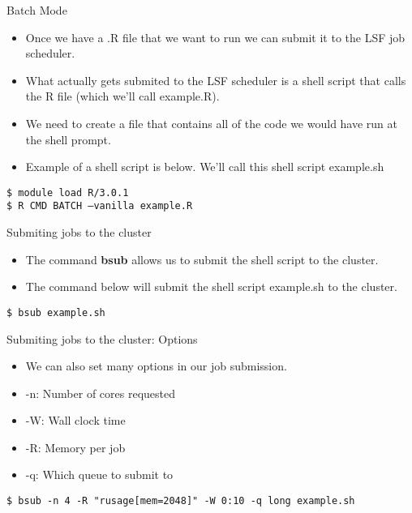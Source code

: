 \documentclass[table]{beamer}\usepackage[]{graphicx}\usepackage[]{color}
\begin{document}
\begin{frame}{Batch Mode}
\begin{itemize}
\item Once we have a .R file that we want to run we can submit it to the LSF job scheduler.  
\item What actually gets submited to the LSF scheduler is a shell script that calls the R file (which we'll call example.R). 
\item We need to create a file that contains all of the code we would have run at the shell prompt.  
\item Example of a shell script is below. We'll call this shell script example.sh
\end{itemize}
{\tt \$ module load R/3.0.1 }\\
{\tt \$ R CMD BATCH --vanilla example.R}\\
\end{frame}

\begin{frame}{Submiting jobs to the cluster}
\begin{itemize}
\item The command {\bf bsub} allows us to submit the shell script to the cluster. 
\item The command below will submit the shell script example.sh to the cluster.  
\end{itemize}
{\tt \$ bsub example.sh}
\end{frame}


\begin{frame}{Submiting jobs to the cluster: Options}
\begin{itemize}
\item We can also set many options in our job submission. 
\item -n: Number of cores requested
\item -W: Wall clock time
\item -R: Memory per job
\item -q: Which queue to submit to
\end{itemize}
{\tt \$ bsub -n 4 -R "rusage[mem=2048]" -W 0:10 -q long example.sh}
\end{frame}
\end{document}
